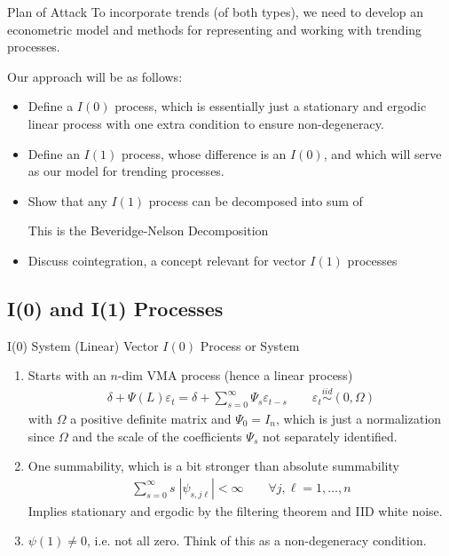 \documentclass[aspectratio=169, handout]{beamer}
\newcommand{\iid}{\overset{iid}{\sim}}
\begin{document}
{\footnotesize
\begin{frame}{Plan of Attack}
To incorporate trends (of both types), we need to develop an econometric
model and methods for representing and working with trending processes.

Our approach will be as follows:
\begin{itemize}
  \item Define a $I(0)$ process, which is essentially just a stationary
    and ergodic linear process with one extra condition to ensure
    non-degeneracy.
  \pause
  \item Define an $I(1)$ process, whose difference is an $I(0)$, and
    which will serve as our model for trending processes.
  \pause
  \item Show that any $I(1)$ process can be decomposed into sum of
    This is the \alert{Beveridge-Nelson Decomposition}
  \pause
  \item Discuss \alert{cointegration}, a concept relevant for vector
    $I(1)$ processes
\end{itemize}
\end{frame}
}

\subsection{I(0) and I(1) Processes}

{\footnotesize
\begin{frame}{I(0) System}
  \alert{(Linear) Vector $I(0)$ Process or System}
\begin{enumerate}
  \item Starts with an $n$-dim VMA process (hence a linear process)
    \begin{align*}
      \delta + \Psi(L)\varepsilon_t
      = \delta + \sum_{s=0}^\infty \Psi_s\varepsilon_{t-s}
      \qquad
      \varepsilon_t
      \iid (0,\Omega)
    \end{align*}
    with $\Omega$ a positive definite matrix and $\Psi_0=I_n$, which is
    just a normalization since $\Omega$ and the scale of the
    coefficients $\Psi_s$ not separately identified.

  \pause
  \item \alert{One summability}, which is a bit stronger than absolute
    summability
    \begin{align*}
      \sum_{s=0}^\infty
      s\;|\psi_{s,j\ell}|
      < \infty
      \qquad
      \forall j,\ell=1,\ldots,n
    \end{align*}
    Implies \alert{stationary} and \alert{ergodic} by the filtering
    theorem and IID white noise.

  \pause
  \item $\psi(1)\neq 0$, i.e. not all zero.
    Think of this as a non-degeneracy condition.
\end{enumerate}
\end{frame}
}
\end{document}
